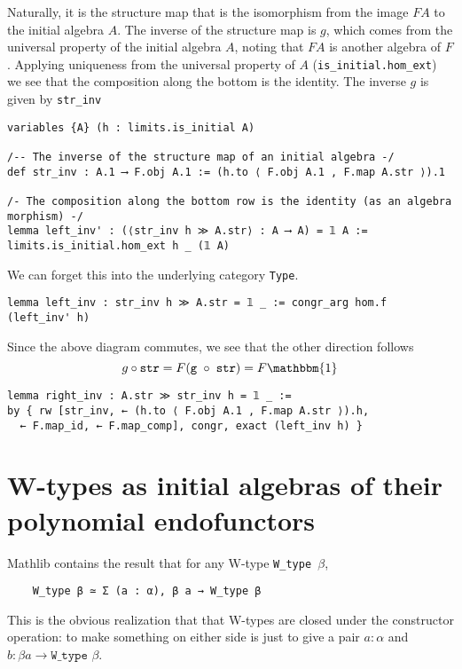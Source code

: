 \documentclass{article}
\newcommand{\al}{\alpha}
\newcommand{\be}{\beta}
\newcommand{\id}[1]{\mathbbm{1}_{#1}}
\newcommand{\<}{\langle}
\renewcommand{\>}{\rangle}
\theoremstyle{definitionstyle}
\theoremstyle{exercisestyle}
\theoremstyle{remarkstyle}
\begin{document}
Naturally, it is the structure map that is the isomorphism
from the image $F A$ to the initial algebra $A$.
The inverse of the structure map is $g$,
which comes from the universal property of the initial algebra $A$,
noting that $F A$ is another algebra of $F$.
Applying uniqueness from the universal property of $A$
(\texttt{is\_initial.hom\_ext})
we see that the composition along the bottom is the identity.
The inverse $g$ is given by \texttt{str\_inv}

\begin{lstlisting}
variables {A} (h : limits.is_initial A)

/-- The inverse of the structure map of an initial algebra -/
def str_inv : A.1 ⟶ F.obj A.1 := (h.to ⟨ F.obj A.1 , F.map A.str ⟩).1

/- The composition along the bottom row is the identity (as an algebra morphism) -/
lemma left_inv' : (⟨str_inv h ≫ A.str⟩ : A ⟶ A) = 𝟙 A :=
limits.is_initial.hom_ext h _ (𝟙 A) \end{lstlisting}

We can forget this into the underlying category \texttt{Type}.

\begin{lstlisting}
lemma left_inv : str_inv h ≫ A.str = 𝟙 _ := congr_arg hom.f (left_inv' h) \end{lstlisting}
Since the above diagram commutes, we see that the other direction follows
\[ g \circ \texttt{str} = F (\texttt{g $\circ$ str}) = F \id{} \]

\begin{lstlisting}
lemma right_inv : A.str ≫ str_inv h = 𝟙 _ :=
by { rw [str_inv, ← (h.to ⟨ F.obj A.1 , F.map A.str ⟩).h,
  ← F.map_id, ← F.map_comp], congr, exact (left_inv h) } \end{lstlisting}

\section{W-types as initial algebras of their polynomial endofunctors}

Mathlib contains the result that for any W-type \texttt{W\_type $\be$},
\begin{lstlisting}
    W_type β ≃ Σ (a : α), β a → W_type β \end{lstlisting}
This is the obvious realization that
that W-types are closed under the constructor operation:
to make something on either side is just to give a pair $a : \al$ and
$b : \be a \to \texttt{W\_type } \be$.
\end{document}
